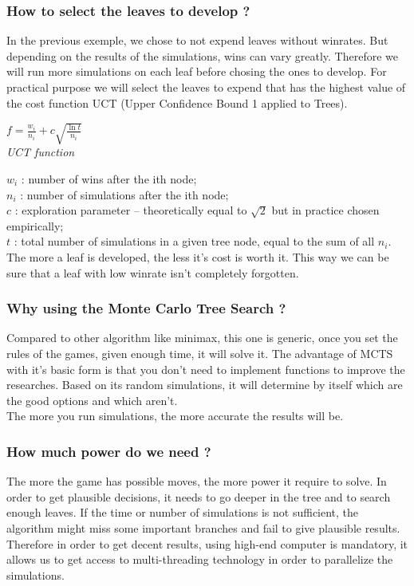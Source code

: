 \subsubsection{How to select the leaves to develop ?}
In the previous exemple, we chose to not expend leaves without winrates. But depending on the results of the simulations, wins can vary greatly. Therefore we will run more simulations on each leaf before chosing the ones to develop. For practical purpose we will select the leaves to expend that has the highest value of the cost function UCT (Upper Confidence Bound 1 applied to Trees).\\
\bigskip
\begin{minipage}[b]{1\linewidth}
\centering
\ensuremath{f = \frac{w_i}{n_i} + c\sqrt{\frac{\ln t}{n_i}}}\\
\medskip
\tiny{\textit{UCT function}}
\end{minipage}%
\bigskip
\ensuremath{w_i} : number of wins after the ith node;\\
\ensuremath{n_i} : number of simulations after the ith node;\\
\ensuremath{c}   : exploration parameter – theoretically equal to \ensuremath{\sqrt{2}} but in practice chosen empirically;\\
\ensuremath{t}   : total number of simulations in a given tree node, equal to the sum of all \ensuremath{n_i}.\\
\medskip
The more a leaf is developed, the less it's cost is worth it. This way we can be sure that a leaf with low winrate isn't completely forgotten.\\

\subsubsection{Why using the Monte Carlo Tree Search ?}
Compared to other algorithm like minimax, this one is generic, once you set the rules of the games, given enough time, it will solve it. The advantage of MCTS with it's basic form is that you don't need to implement functions to improve the researches. Based on its random simulations, it will determine by itself which are the good options and which aren't.\\ The more you run simulations, the more accurate the results will be.

\subsubsection{How much power do we need ?}
The more the game has possible moves, the more power it require to solve. In order to get plausible decisions, it needs to go deeper in the tree and to search enough leaves. If the time or number of simulations is not sufficient, the algorithm might miss some important branches and fail to give plausible results. Therefore in order to get decent results, using high-end computer is mandatory, it allows us to get access to multi-threading technology in order to parallelize the simulations.